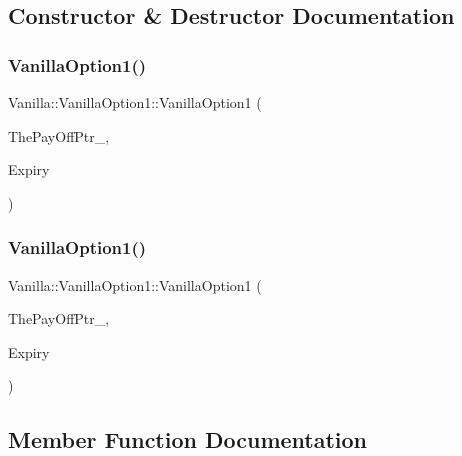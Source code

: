 \subsection{Constructor \& Destructor Documentation}
\hypertarget{classVanilla_1_1VanillaOption1_ae5c50e3421d7dfbe95dfecddc5f5ea07}{}\label{classVanilla_1_1VanillaOption1_ae5c50e3421d7dfbe95dfecddc5f5ea07} 
\subsubsection{\texorpdfstring{Vanilla\+Option1()}{VanillaOption1()}\hspace{0.1cm}{\footnotesize\ttfamily [1/2]}}
{\footnotesize\ttfamily Vanilla\+::\+Vanilla\+Option1\+::\+Vanilla\+Option1 (\begin{DoxyParamCaption}\item[{\hyperlink{classPayOff}{Pay\+Off} $\ast$}]{The\+Pay\+Off\+Ptr\+\_\+,  }\item[{double}]{Expiry }\end{DoxyParamCaption})}

\hypertarget{classVanilla_1_1VanillaOption1_a9091b6dab572b9856fb318d8e35849f1}{}\label{classVanilla_1_1VanillaOption1_a9091b6dab572b9856fb318d8e35849f1} 
\subsubsection{\texorpdfstring{Vanilla\+Option1()}{VanillaOption1()}\hspace{0.1cm}{\footnotesize\ttfamily [2/2]}}
{\footnotesize\ttfamily Vanilla\+::\+Vanilla\+Option1\+::\+Vanilla\+Option1 (\begin{DoxyParamCaption}\item[{std\+::unique\+\_\+ptr$<$ \hyperlink{classPayOff}{Pay\+Off} $>$ \&}]{The\+Pay\+Off\+Ptr\+\_\+,  }\item[{double}]{Expiry }\end{DoxyParamCaption})}



\subsection{Member Function Documentation}
\hypertarget{classVanilla_1_1VanillaOption1_a868ff90c27c93d8d58fe94ff512010b2}{}\label{classVanilla_1_1VanillaOption1_a868ff90c27c93d8d58fe94ff512010b2} 
